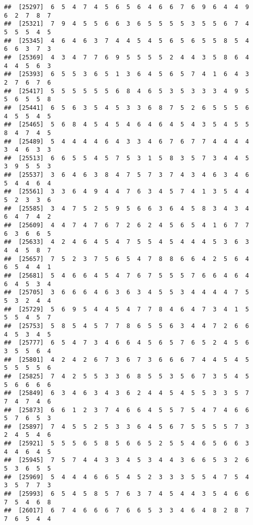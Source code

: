 \documentclass[
]{book}
\begin{document}
\begin{verbatim}
##  [25297]  6  5  4  7  4  5  6  5  6  4  6  6  7  6  9  6  4  4  9  6  2  7  8  7
##  [25321]  7  9  4  5  5  6  6  3  6  5  5  5  5  3  5  5  6  7  4  5  5  5  4  5
##  [25345]  4  6  4  6  3  7  4  4  5  4  5  6  5  6  5  5  8  5  4  6  6  3  7  3
##  [25369]  4  3  4  7  7  6  9  5  5  5  5  2  4  4  3  5  8  6  4  4  4  5  6  3
##  [25393]  6  5  5  3  6  5  1  3  6  4  5  6  5  7  4  1  6  4  3  2  7  6  7  6
##  [25417]  5  5  5  5  5  5  6  8  4  6  5  3  5  3  3  3  4  9  5  5  6  5  5  8
##  [25441]  6  5  6  3  5  4  5  3  3  6  8  7  5  2  6  5  5  5  6  4  5  5  4  5
##  [25465]  5  6  8  4  5  4  5  4  6  4  6  4  5  4  3  5  4  5  5  8  4  7  4  5
##  [25489]  5  4  4  4  4  6  4  3  3  4  6  7  6  7  7  4  4  4  4  3  4  6  3  3
##  [25513]  6  6  5  5  4  5  7  5  3  1  5  8  3  5  7  3  4  4  5  3  9  5  5  3
##  [25537]  3  6  4  6  3  8  4  7  5  7  3  7  4  3  4  6  3  4  6  5  4  4  6  4
##  [25561]  3  3  6  4  9  4  4  7  6  3  4  5  7  4  1  3  5  4  4  5  2  3  3  6
##  [25585]  3  4  7  5  2  5  9  5  6  6  3  6  4  5  8  3  4  3  4  6  4  7  4  2
##  [25609]  4  4  7  4  7  6  7  2  6  2  4  5  6  5  4  1  6  7  7  6  3  6  6  5
##  [25633]  4  2  4  6  4  5  4  7  5  5  4  5  4  4  4  5  3  6  3  4  4  5  8  7
##  [25657]  7  5  2  3  7  5  6  5  4  7  8  8  6  6  4  2  5  6  4  6  5  4  4  1
##  [25681]  5  4  6  6  4  5  4  7  6  7  5  5  5  7  6  6  4  6  4  6  4  5  3  4
##  [25705]  3  6  6  6  4  6  3  6  3  4  5  5  3  4  4  4  4  7  5  5  3  2  4  4
##  [25729]  5  6  9  5  4  4  5  4  7  7  8  4  6  4  7  3  4  1  5  5  5  4  5  7
##  [25753]  5  8  5  4  5  7  7  8  6  5  5  6  3  4  4  7  2  6  6  4  5  3  4  5
##  [25777]  6  5  4  7  3  4  6  6  4  5  6  5  7  6  5  2  4  5  6  3  5  5  6  4
##  [25801]  4  2  4  2  6  7  3  6  7  3  6  6  6  7  4  4  5  4  5  5  5  5  5  6
##  [25825]  7  4  2  5  5  3  3  6  8  5  5  3  5  6  7  3  5  4  5  5  6  6  6  6
##  [25849]  6  3  4  6  3  4  3  6  2  4  4  5  4  5  5  3  3  5  7  7  4  7  4  6
##  [25873]  6  6  1  2  3  7  4  6  6  4  5  5  7  5  4  7  4  6  6  5  7  6  5  3
##  [25897]  7  4  5  5  2  5  3  3  6  4  5  6  7  5  5  5  5  7  3  2  4  5  4  6
##  [25921]  5  5  5  6  5  8  5  6  6  5  2  5  5  4  6  5  6  6  3  4  4  6  4  5
##  [25945]  7  5  7  4  4  3  3  4  5  3  4  4  3  6  6  5  3  2  6  5  3  6  5  5
##  [25969]  5  4  4  4  6  6  5  4  5  2  3  3  3  5  5  4  7  5  4  3  5  7  7  3
##  [25993]  6  5  4  5  8  5  7  6  3  7  4  5  4  4  3  5  4  6  6  7  5  4  6  8
##  [26017]  6  7  4  6  6  6  7  6  6  5  3  3  4  6  4  8  2  8  7  7  6  5  4  4

\end{verbatim}
\end{document}
